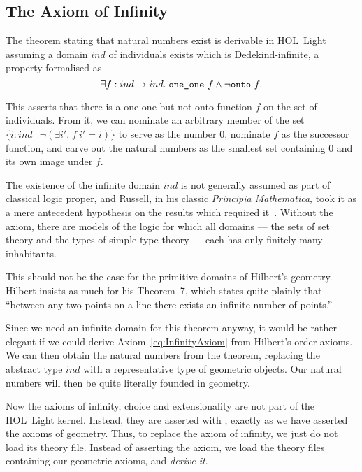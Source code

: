 \subsection{The Axiom of Infinity}
The theorem stating that natural numbers exist is derivable in HOL~Light assuming a domain $ind$ of individuals exists which is Dedekind-infinite, a property formalised as
\begin{equation}\label{eq:InfinityAxiom}
  \exists f : ind\rightarrow ind.\; \texttt{one\_one}\ f \wedge \neg\texttt{onto}\ f.
\end{equation}

This asserts that there is a one-one but not onto function $f$ on the set of individuals. From it, we can nominate an arbitrary member of the set \mbox{$\{ i : ind\ \vert\ \neg(\exists i'.\; f\ i' = i) \}$} to serve as the number $0$, nominate $f$ as the successor function, and carve out the natural numbers as the smallest set containing $0$ and its own image under $f$.

The existence of the infinite domain $ind$ is not generally assumed as part of classical logic proper, and Russell, in his classic \emph{Principia Mathematica}, took it as a mere antecedent hypothesis on the results which required it~\cite{LogicismRevisited}. Without the axiom, there are models of the logic for which all domains --- the sets of set theory and the types of simple type theory --- each has only finitely many inhabitants.

This should not be the case for the primitive domains of Hilbert's geometry. Hilbert insists as much for his Theorem~7, which states quite plainly that ``between any two points on a line there exists an infinite number of points.'' 

Since we need an infinite domain for this theorem anyway, it would be rather elegant if we could derive Axiom~\ref{eq:InfinityAxiom} from Hilbert's order axioms. We can then obtain the natural numbers from the theorem, replacing the abstract type $ind$ with a representative type of geometric objects. Our natural numbers will then be quite literally founded in geometry.

Now the axioms of infinity, choice and extensionality are not part of the HOL~Light kernel. Instead, they are asserted with , exactly as we have asserted the axioms of geometry. Thus, to replace the axiom of infinity, we just do not load its theory file. Instead of asserting the axiom, we load the theory files containing our geometric axioms, and \emph{derive it}. 

